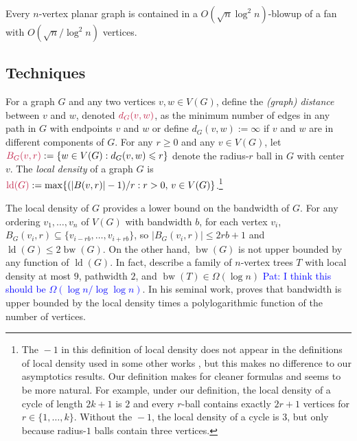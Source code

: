 \documentclass{patmorin}
\makeatletter
\renewcommand{\ge}{\geqslant}
\renewcommand{\le}{\leqslant}
\renewcommand{\leq}{\leqslant}
\newcommand{\david}[1]{{\color{orange} David: #1}}
\newcommand{\pat}[1]{\textcolor{Blue}{Pat: #1}}
\newcommand{\defin}[1]{\emph{\textcolor{brightmaroon}{#1}}}
\def\mathcolor#1#{\@mathcolor{#1}}
\def\@mathcolor#1#2#3{%
  \protect\leavevmode
  \begingroup
    \color#1{#2}#3%
  \endgroup
}
\newcommand{\mathdefin}[1]{\mathcolor{brightmaroon}{#1}}
\DeclareMathOperator{\bw}{bw}
\DeclareMathOperator{\ld}{ld}
\makeatother
\begin{document}
\begin{thm}\label{main_thm_planar_order}
  Every $n$-vertex planar graph is contained in a $O(\sqrt{n}\log^2 n)$-blowup of a fan with
  $O(\sqrt{n}/\log^2 n)$ vertices.
\end{thm}



\subsection{Techniques}

For a graph $G$ and any two vertices $v,w\in V(G)$, define the \defin{(graph) distance} between $v$ and $w$, denoted $\mathdefin{d_G(v,w)}$, as the minimum number of edges in any path in $G$ with endpoints $v$ and $w$ or define $d_G(v,w):=\infty$ if $v$ and $w$ are in different components of $G$.  For any $r\ge 0$ and any $v\in V(G)$, let $\mathdefin{B_G(v,r)}:=\{w\in V(G):d_G(v,w)\le r\}$ denote the radius-$r$ ball in $G$ with center $v$.
The \defin{local density} of a graph $G$ is $\mathdefin{\ld(G)}:=\max\{(|B(v,r)|-1)/r:r> 0,\, v\in V(G)\}$.\footnote{The ${}-1$ in this definition of local density does not appear in the definitions of local density used in some other works \cite{feige:approximating,rao:small}, but this makes no difference to our asymptotics results.  Our definition makes for cleaner formulas and seems to be more natural. For example, under our definition, the local density of a cycle of length $2k+1$ is $2$ and every $r$-ball contains exactly $2r+1$ vertices for $r\in\{1,\ldots,k\}$. Without the ${}-1$, the local density of a cycle is $3$, but only because radius-$1$ balls contain three vertices.}

The local density of $G$ provides a lower bound on the bandwidth of $G$. For any ordering $v_1,\dots,v_n$ of $V(G)$ with bandwidth $b$, for each vertex $v_i$, $B_G(v_i,r) \subseteq \{v_{i-rb},\dots,v_{i+rb}\}$, so $|B_G(v_i,r)|\leq 2rb+1$ and $\ld(G)\leq 2\bw(G)$.
On the other hand, $\bw(G)$ is not upper bounded by any function of $\ld(G)$. In fact, \citet{CS89} describe a family of $n$-vertex trees $T$ with local density at most $9$, pathwidth $2$, and  $\bw(T)\in\Omega(\log n)$ \pat{I think this should be $\Omega(\log n/\log\log n)$}.
In his seminal work, \citet{feige:approximating} proves that bandwidth is upper bounded by the local density times a polylogarithmic function of the number of vertices.
\end{document}
